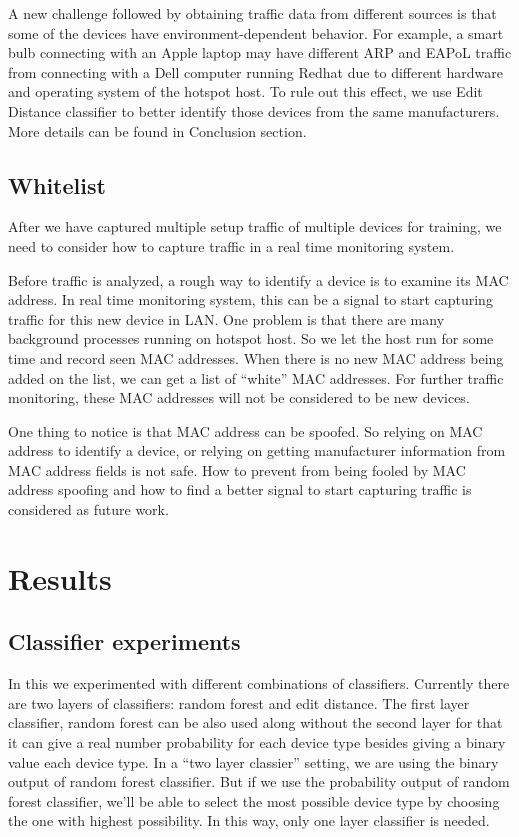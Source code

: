 \documentclass[twocolumn,10pt]{article}
\begin{document}
A new challenge followed by obtaining traffic data from different sources is that some of the devices have environment-dependent behavior. For example, a smart bulb connecting with an Apple laptop may have different ARP and EAPoL traffic from connecting with a Dell computer running Redhat due to different hardware and operating system of the hotspot host. To rule out this effect, we use Edit Distance classifier to better identify those devices from the same manufacturers. More details can be found in Conclusion section.

\subsection{Whitelist}

After we have captured multiple setup traffic of multiple devices for training, we need to consider how to capture traffic in a real time monitoring system.
 
Before traffic is analyzed, a rough way to identify a device is to examine its MAC address. In real time monitoring system, this can be a signal to start capturing traffic for this new device in LAN. One problem is that there are many background processes running on hotspot host. So we let the host run for some time and record seen MAC addresses. When there is no new MAC address being added on the list, we can get a list of “white” MAC addresses. For further traffic monitoring, these MAC addresses will not be considered to be new devices.
 
One thing to notice is that MAC address can be spoofed. So relying on MAC address to identify a device, or relying on getting manufacturer information from MAC address fields is not safe. How to prevent from being fooled by MAC address spoofing and how to find a better signal to start capturing traffic is considered as future work.


\section{Results}

\subsection{Classifier experiments}

In this we experimented with different combinations of classifiers. Currently there are two layers of classifiers: random forest and edit distance. The first layer classifier, random forest can be also used along without the second layer for that it can give a real number probability for each device type besides giving a binary value each device type. In a “two layer classier” setting, we are using the binary output of random forest classifier. But if we use the probability output of random forest classifier, we’ll be able to select the most possible device type by choosing the one with highest possibility. In this way, only one layer classifier is needed.
\end{document}
